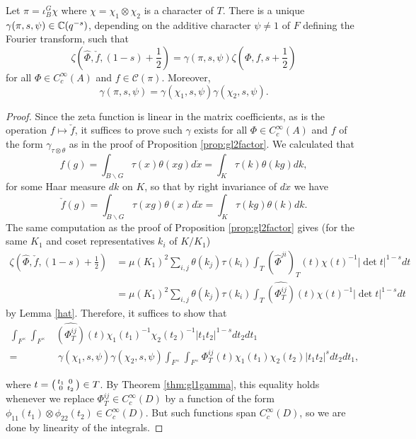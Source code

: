 \begin{prop}\label{prop:gl2gamma}
    Let $\pi = \iota_B^G \chi$ where $\chi=\chi_1\otimes \chi_2$ is a character of $T$. There is a unique $\gamma(\pi,s,\psi) \in \mathbb{C}(q^{-s})$, depending on the additive character $\psi \neq 1$ of $F$ defining the Fourier transform, such that 
    $$\zeta(\hat{\Phi},\check{f},(1-s)+\frac{1}{2}) = \gamma(\pi,s,\psi) \zeta(\Phi,f,s+\frac{1}{2})$$
    for all $\Phi \in C_c^\infty(A)$ and $f \in \mathcal C(\pi)$. Moreover, 
    $$\gamma(\pi,s,\psi) = \gamma(\chi_1,s,\psi)\gamma(\chi_2,s,\psi).$$
\end{prop}
\begin{proof}
    Since the zeta function is linear in the matrix coefficients, as is the operation $f \mapsto \check{f}$, it suffices to prove such $\gamma$ exists for all $\Phi \in C_c^\infty(A)$ and $f$ of the form $\gamma_{\tau \otimes \theta}$ as in the proof of Proposition \ref{prop:gl2factor}. We calculated that 
    $$f(g) = \int_{B \backslash G} \tau(x)\theta(xg) d\dot{x} = \int_K \tau(k)\theta(kg)dk,$$ for some Haar measure $dk$ on $K$, so that by right invariance of $d\dot{x}$ we have 
    $$\check{f}(g) = \int_{B \backslash G}\tau(xg)\theta(x) d\dot{x} = \int_K \tau(kg)\theta(k)dk.$$ The same computation as the proof of Proposition \ref{prop:gl2factor} gives (for the same $K_1$ and coset representatives $k_i$ of $K/K_1$)
    \begin{equation*}
        \begin{split}
            \zeta(\hat{\Phi},\check{f},(1-s)+\frac{1}{2}) &= \mu(K_1)^2 \sum\limits_{i,j} \theta(k_j)\tau(k_i) \int_T (\hat\Phi^{ji})_T(t) \chi(t)^{-1} |\det t|^{1-s} dt \\
            &= \mu(K_1)^2 \sum\limits_{i,j} \theta(k_j)\tau(k_i) \int_T \widehat{(\Phi_T^{ij})}(t) \chi(t)^{-1} |\det t|^{1-s} dt
        \end{split}
    \end{equation*}
    by Lemma \ref{hat}. Therefore, it suffices to show that 
    \begin{align*}
        \int_{F^\times}\int_{F^\times}& \widehat{(\Phi^{ij}_T)}(t)\chi_1(t_1)^{-1}\chi_2(t_2)^{-1}|t_1t_2|^{1-s} dt_2dt_1 \\
        =&\ \gamma(\chi_1,s,\psi)\gamma(\chi_2,s,\psi) \int_{F^\times} \int_{F^\times}\Phi^{ij}_T(t)\chi_1(t_1)\chi_2(t_2) |t_1t_2|^s dt_2dt_1,
    \end{align*}
    
    where $t = \begin{psmallmatrix}
        t_1 &0\\0&t_2
    \end{psmallmatrix} \in T$. By Theorem \ref{thm:gl1gamma}, this equality holds whenever we replace $\Phi^{ij}_T \in C_c^\infty(D)$ by a function of the form $\phi_{11}(t_1) \otimes \phi_{22}(t_2) \in C_c^\infty(D)$. But such functions span $C_c^\infty(D)$, so we are done by linearity of the integrals.
\end{proof}

